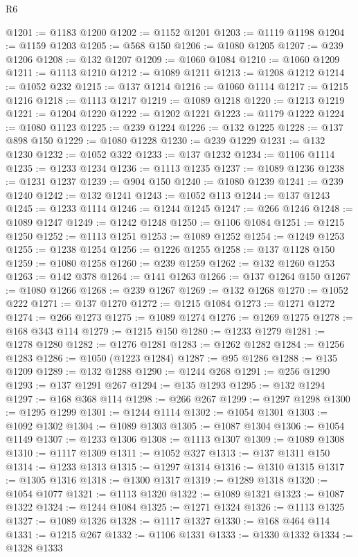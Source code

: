 \begin{lexlean}{R6}
\begin{coremodule}
@1201 := @1183 @1200
@1202 := @1152 @1201
@1203 := @1119 @1198
@1204 := @1159 @1203
@1205 := @568 @150
@1206 := @1080 @1205
@1207 := @239 @1206
@1208 := @132 @1207
@1209 := @1060 @1084
@1210 := @1060 @1209
@1211 := @1113 @1210
@1212 := @1089 @1211
@1213 := @1208 @1212
@1214 := @1052 @232
@1215 := @137 @1214
@1216 := @1060 @1114
@1217 := @1215 @1216
@1218 := @1113 @1217
@1219 := @1089 @1218
@1220 := @1213 @1219
@1221 := @1204 @1220
@1222 := @1202 @1221
@1223 := @1179 @1222
@1224 := @1080 @1123
@1225 := @239 @1224
@1226 := @132 @1225
@1228 := @137 @898 @150
@1229 := @1080 @1228
@1230 := @239 @1229
@1231 := @132 @1230
@1232 := @1052 @322
@1233 := @137 @1232
@1234 := @1106 @1114
@1235 := @1233 @1234
@1236 := @1113 @1235
@1237 := @1089 @1236
@1238 := @1231 @1237
@1239 := @904 @150
@1240 := @1080 @1239
@1241 := @239 @1240
@1242 := @132 @1241
@1243 := @1052 @113
@1244 := @137 @1243
@1245 := @1233 @1114
@1246 := @1244 @1245
@1247 := @266 @1246
@1248 := @1089 @1247
@1249 := @1242 @1248
@1250 := @1106 @1084
@1251 := @1215 @1250
@1252 := @1113 @1251
@1253 := @1089 @1252
@1254 := @1249 @1253
@1255 := @1238 @1254
@1256 := @1226 @1255
@1258 := @137 @1128 @150
@1259 := @1080 @1258
@1260 := @239 @1259
@1262 := @132 @1260 @1253
@1263 := @142 @378
@1264 := @141 @1263
@1266 := @137 @1264 @150
@1267 := @1080 @1266
@1268 := @239 @1267
@1269 := @132 @1268
@1270 := @1052 @222
@1271 := @137 @1270
@1272 := @1215 @1084
@1273 := @1271 @1272
@1274 := @266 @1273
@1275 := @1089 @1274
@1276 := @1269 @1275
@1278 := @168 @343 @114
@1279 := @1215 @150
@1280 := @1233 @1279
@1281 := @1278 @1280
@1282 := @1276 @1281
@1283 := @1262 @1282
@1284 := @1256 @1283
@1286 := @1050 (@1223 @1284)
@1287 := @95 @1286
@1288 := @135 @1209
@1289 := @132 @1288
@1290 := @1244 @268
@1291 := @256 @1290
@1293 := @137 @1291 @267
@1294 := @135 @1293
@1295 := @132 @1294
@1297 := @168 @368 @114
@1298 := @266 @267
@1299 := @1297 @1298
@1300 := @1295 @1299
@1301 := @1244 @1114
@1302 := @1054 @1301
@1303 := @1092 @1302
@1304 := @1089 @1303
@1305 := @1087 @1304
@1306 := @1054 @1149
@1307 := @1233 @1306
@1308 := @1113 @1307
@1309 := @1089 @1308
@1310 := @1117 @1309
@1311 := @1052 @327
@1313 := @137 @1311 @150
@1314 := @1233 @1313
@1315 := @1297 @1314
@1316 := @1310 @1315
@1317 := @1305 @1316
@1318 := @1300 @1317
@1319 := @1289 @1318
@1320 := @1054 @1077
@1321 := @1113 @1320
@1322 := @1089 @1321
@1323 := @1087 @1322
@1324 := @1244 @1084
@1325 := @1271 @1324
@1326 := @1113 @1325
@1327 := @1089 @1326
@1328 := @1117 @1327
@1330 := @168 @464 @114
@1331 := @1215 @267
@1332 := @1106 @1331
@1333 := @1330 @1332
@1334 := @1328 @1333

\end{coremodule}
\end{lexlean}
